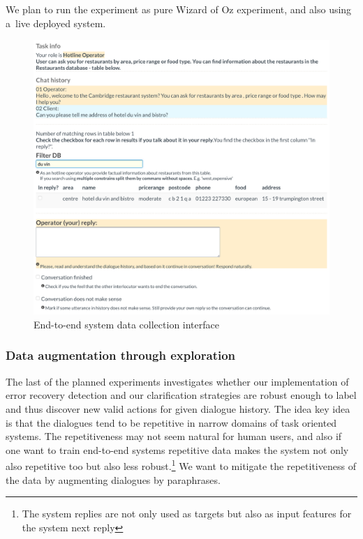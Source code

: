 \documentclass[11pt]{article}
\begin{document}
We plan to run the experiment as pure Wizard of Oz experiment, and also using a~live deployed system.

\begin{figure}[!tb]
    \centering
    \includegraphics[width=1.0\linewidth]{gui-annotators-system}
    \caption{End-to-end system data collection interface}
\label{fig:wochat}
\end{figure}

\subsubsection*{Data augmentation through exploration}
The last of the planned experiments investigates whether our implementation of error recovery detection and our clarification strategies are robust enough to label and thus discover new valid actions for given dialogue history.
The idea key idea is that the dialogues tend to be repetitive in narrow domains of task oriented systems.
The repetitiveness may not seem natural for human users, and also if one want to train end-to-end systems repetitive data makes the system not only also repetitive too but also less robust.\footnote{The system replies are not only used as targets but also as input features for the system next reply} 
We want to mitigate the repetitiveness of the data by augmenting dialogues by paraphrases.
\end{document}
